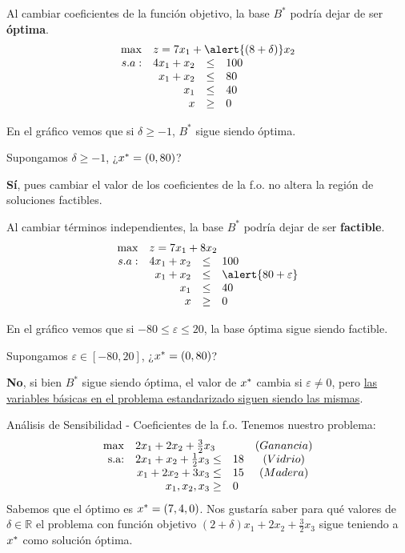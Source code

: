 \documentclass[10pt, aspectratio=169]{beamer}
\begin{document}
\begin{frame}{}
    Al cambiar coeficientes de la función objetivo, la base $B^\ast$ podría dejar de ser \pause \textbf{óptima}.
        \[
        \begin{array}{rrcl}
        \max & \multicolumn{3}{l}{z = 7x_1+\alert{(8+\delta)}x_2} \\
        s.a: & 4x_1+x_2 & \leq & 100 \\
         & x_1+x_2 & \leq & 80 \\
         & x_1 & \leq & 40 \\
         & x& \geq & 0
        \end{array}
        \]
    
    En el gráfico vemos que si $\delta\geq -1$, $B^\ast$ sigue siendo óptima.
    
    Supongamos $\delta\geq -1$, ¿$x^{\ast} = (0, 80)$? \pause
    
    \textbf{Sí}, pues cambiar el valor de los coeficientes de la f.o. no altera la región de soluciones factibles.
\end{frame}

\begin{frame}{}
    Al cambiar términos independientes, la base $B^\ast$ podría dejar de ser \pause \textbf{factible}.
    \[
    \begin{array}{rrcl}
    \max & \multicolumn{3}{l}{z = 7x_1+8x_2} \\
    s.a: & 4x_1+x_2 & \leq & 100 \\
     & x_1+x_2 & \leq & \alert{80 + \varepsilon} \\
     & x_1 & \leq & 40 \\
     & x& \geq & 0
    \end{array}
    \]
    
    En el gráfico vemos que si $-80\leq \varepsilon \leq 20$, la base óptima sigue siendo factible.
    
    Supongamos $\varepsilon\in[-80, 20]$, ¿$x^{\ast} = (0, 80)$? \pause
    
    \textbf{No}, si bien $B^\ast$ sigue siendo óptima, el valor de $x^{\ast}$ cambia si $\varepsilon\neq 0$, pero \underline{las variables básicas en el problema estandarizado siguen siendo las mismas}.
    
\end{frame}

\begin{frame}{Análisis de Sensibilidad - Coeficientes de la f.o.}
    Tenemos nuestro problema:
    $$
    \begin{array}{rrlc}
    \max & \multicolumn{2}{l}{2x_1+2x_2+\frac{3}{2}x_3} & (Ganancia)\\
    \text{s.a:}& 2x_1+x_2+\frac{1}{2}x_3\leq & 18 & (Vidrio)\\
     & x_1+2x_2+3x_3\leq & 15 & (Madera)\\
     & x_1, x_2, x_3\geq & 0 \\
    \end{array}
    $$
    Sabemos que el óptimo es $x^{\ast}=(7,4,0)$. Nos gustaría saber para qué valores de $\delta\in\mathbb{R}$ el problema con función objetivo $(2+\delta)x_1+2x_2+\frac{3}{2}x_3$ sigue teniendo a $x^{\ast}$ como solución óptima.
\end{frame}
\end{document}
